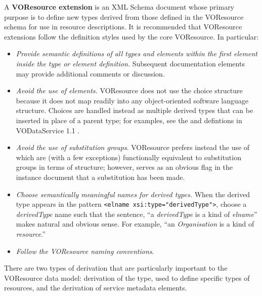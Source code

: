 \documentclass[11pt,a4paper]{ivoa}
\begin{document}
A \textbf{VOResource extension} is an XML Schema document whose primary
purpose is to define new types derived from those defined in the
VOResource schema for use in resource descriptions.  It is recommended
that VOResource extensions follow the definition styles used by the core
VOResource.  In particular:

\begin{itemize}
  \item \emph{Provide semantic definitions of all types and elements within
       the first  element inside
       the type or element definition.}  Subsequent
       documentation elements may provide
       additional comments or discussion.

  \item \emph{Avoid the use of  elements.}
       VOResource does not use the choice structure because it does
       not map readily into any object-oriented software language
       structure.  Choices are handled instead as multiple derived
       types that can be inserted in place of a parent type; for
       examples, see the  and
        defintions in VODataService 1.1
       \citep{2010ivoa.spec.1202P}. %

  \item \emph{Avoid the use of substitution groups}.  VOResource
       prefers instead the use of  which are
       (with a few exceptions) functionally equivalent to substitution
       groups in terms of structure; however, 
       serves as an obvious flag in the instance document that a
       substitution has been made.

  \item \emph{Choose semantically meaningful names for derived
       types.}  When the derived type appears in the pattern
       \verb|<elname xsi:type="derivedType">|,
       choose a \textit{derivedType} name such that the sentence, ``a
       \textit{derivedType} is a kind of \textit{elname}'' makes natural
       and obvious sense.  For example, ``an \textit{Organisation} is a
       kind of \textit{resource}.''

  \item \emph{Follow the VOResource naming conventions}.
\end{itemize}



There are two types of derivation that are particularly important to
the VOResource data model:  derivation of the 
type, used to define specific types of resources, and the derivation
of service metadata elements.
\end{document}
